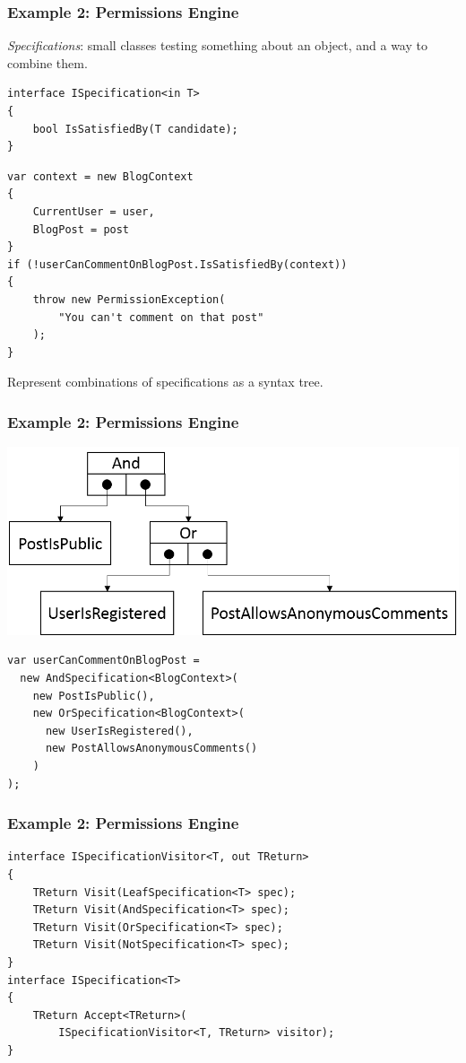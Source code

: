 \documentclass{beamer}
\begin{document}
  \begin{frame}[fragile]
    \frametitle{Example 2: Permissions Engine}
    \emph{Specifications}: small classes testing something about an object, and a way to combine them.
    
    \begin{verbatim}
interface ISpecification<in T>
{
    bool IsSatisfiedBy(T candidate);
}
    \end{verbatim}
    \pause
    \begin{verbatim}
var context = new BlogContext
{
    CurrentUser = user,
    BlogPost = post
}
if (!userCanCommentOnBlogPost.IsSatisfiedBy(context))
{
    throw new PermissionException(
        "You can't comment on that post"
    );
}
    \end{verbatim}
\end{frame}
    
  \begin{frame}[fragile]
    Represent combinations of specifications as a syntax tree.
    \frametitle{Example 2: Permissions Engine}
    \begin{center}
    \includegraphics[scale=0.6]{specification.png}
    \end{center}
    
    \begin{verbatim}
var userCanCommentOnBlogPost =
  new AndSpecification<BlogContext>(
    new PostIsPublic(),
    new OrSpecification<BlogContext>(
      new UserIsRegistered(),
      new PostAllowsAnonymousComments()
    )
);
    \end{verbatim}
\end{frame}

  \begin{frame}[fragile]
    \frametitle{Example 2: Permissions Engine}
    \begin{verbatim}
interface ISpecificationVisitor<T, out TReturn>
{
    TReturn Visit(LeafSpecification<T> spec);
    TReturn Visit(AndSpecification<T> spec);
    TReturn Visit(OrSpecification<T> spec);
    TReturn Visit(NotSpecification<T> spec);
}
interface ISpecification<T>
{
    TReturn Accept<TReturn>(
        ISpecificationVisitor<T, TReturn> visitor);
}
    \end{verbatim}
\end{frame}
\end{document}

